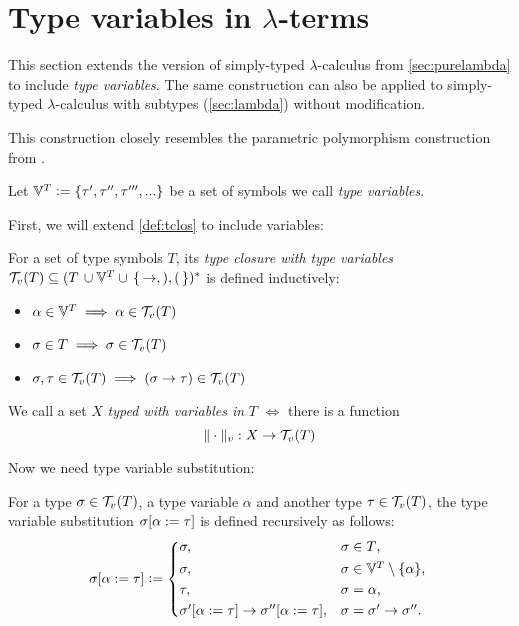 \documentclass[main.tex]{subfiles}
\begin{document}
\section{Type variables in $\lambda$-terms}
\label{lambda:typevars}

This section extends the version of simply-typed $\lambda$-calculus from
\cref{sec:purelambda} to include \emph{type variables}. The same construction
can also be applied to simply-typed $\lambda$-calculus with subtypes
(\cref{sec:lambda}) without modification.

This construction closely resembles the parametric polymorphism construction
from \cite[chap.~25]{pierce}.

Let $\mathbb{V}^{T} \vcentcolon= \{ \tau', \tau'', \tau''', ... \}$ be a set of symbols we
call \emph{type variables}.

First, we will extend \cref{def:tclos} to include variables:
\begin{defn}
    For a set of type symbols $T$, its \emph{type closure with type variables}
    $\mathcal{T}_v( T ) \subseteq (T \, \cup \mathbb{V}^{T} \cup \,\{\, \rightarrow, ), ( \,\})^*$ is defined
    inductively:

    \begin{itemize}
        \item $\alpha \in \mathbb{V}^{T} \implies \alpha \in \mathcal{T}_v( T )$
        \item $\sigma \in T \implies \sigma \in \mathcal{T}_v( T )$
        \item $\sigma, \tau \in \mathcal{T}_v( T ) \implies (\sigma \rightarrow \tau) \in \mathcal{T}_v( T )$
    \end{itemize}
\end{defn}

\begin{defn}
    We call a set $X$ \emph{typed with variables in} $T$ $\iff$ there is a function
    \[ \|\cdot\|_v : X \rightarrow \mathcal{T}_v( T ) \]
\end{defn}

Now we need type variable substitution:
\begin{defn}
    For a type $\sigma \in \mathcal{T}_v( T )$, a type variable $\alpha$ and another
    type $\tau \in \mathcal{T}_v( T )$, the type variable substitution
    $\sigma [ \alpha := \tau ]$ is defined recursively as follows:
    \[
        \subst{\sigma}{\alpha}{\tau} \defeq
        \begin{cases*}
            \sigma ,& $\sigma \in T$, \\
            \sigma ,& $\sigma \in \tvars \setminus \{ \alpha \}$, \\
            \tau ,& $\sigma = \alpha$, \\
            \subst{\sigma'}{\alpha}{\tau} \tot \subst{\sigma''}{\alpha}{\tau}
 ,& $\sigma = \sigma' \tot \sigma''$. \\
        \end{cases*}
    \]
\end{defn}
\end{document}
